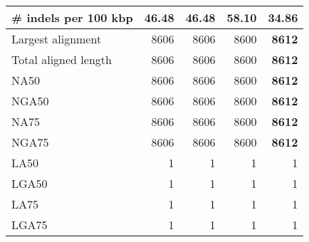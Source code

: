 \documentclass[12pt,a4paper]{article}
\begin{document}
\begin{table}[ht]
\begin{center}
\begin{tabular}{|l*{4}{|r}|}
\# indels per 100 kbp & 46.48 & 46.48 & 58.10 & {\bf 34.86} \\ \hline
Largest alignment & 8606 & 8606 & 8600 & {\bf 8612} \\ \hline
Total aligned length & 8606 & 8606 & 8600 & {\bf 8612} \\ \hline
NA50 & 8606 & 8606 & 8600 & {\bf 8612} \\ \hline
NGA50 & 8606 & 8606 & 8600 & {\bf 8612} \\ \hline
NA75 & 8606 & 8606 & 8600 & {\bf 8612} \\ \hline
NGA75 & 8606 & 8606 & 8600 & {\bf 8612} \\ \hline
LA50 & 1 & 1 & 1 & 1 \\ \hline
LGA50 & 1 & 1 & 1 & 1 \\ \hline
LA75 & 1 & 1 & 1 & 1 \\ \hline
LGA75 & 1 & 1 & 1 & 1 \\ \hline
\end{tabular}
\end{center}
\end{table}
\end{document}
